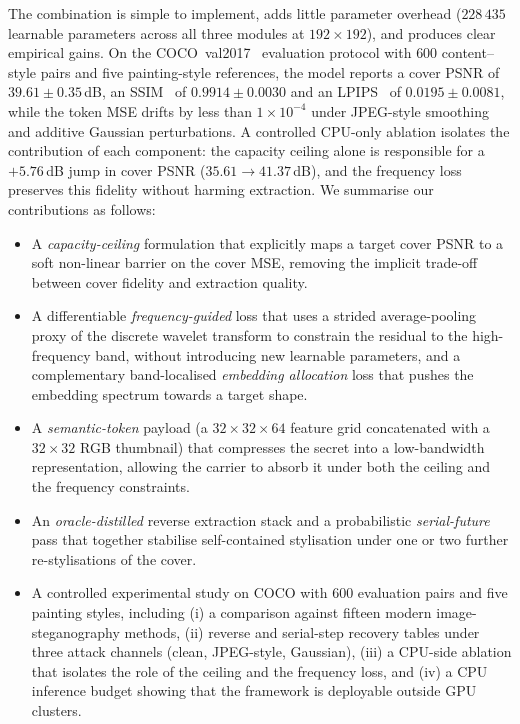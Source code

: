 \documentclass[conference]{IEEEtran}
\begin{document}
The combination is simple to implement, adds little parameter overhead ($228\,435$ learnable parameters across all three modules at $192\!\times\!192$), and produces clear empirical gains. On the COCO~val2017~\cite{coco} evaluation protocol with $600$ content--style pairs and five painting-style references, the model reports a cover PSNR of $39.61\pm0.35$\,dB, an SSIM~\cite{ssim} of $0.9914\pm0.0030$ and an LPIPS~\cite{lpips} of $0.0195\pm0.0081$, while the token MSE drifts by less than $1\times10^{-4}$ under JPEG-style smoothing and additive Gaussian perturbations. A controlled CPU-only ablation isolates the contribution of each component: the capacity ceiling alone is responsible for a $+5.76$\,dB jump in cover PSNR ($35.61\to41.37$\,dB), and the frequency loss preserves this fidelity without harming extraction. We summarise our contributions as follows:
\begin{itemize}
    \item A \emph{capacity-ceiling} formulation that explicitly maps a target cover PSNR to a soft non-linear barrier on the cover MSE, removing the implicit trade-off between cover fidelity and extraction quality.
    \item A differentiable \emph{frequency-guided} loss that uses a strided average-pooling proxy of the discrete wavelet transform to constrain the residual to the high-frequency band, without introducing new learnable parameters, and a complementary band-localised \emph{embedding allocation} loss that pushes the embedding spectrum towards a target shape.
    \item A \emph{semantic-token} payload (a $32\!\times\!32\!\times\!64$ feature grid concatenated with a $32\!\times\!32$ RGB thumbnail) that compresses the secret into a low-bandwidth representation, allowing the carrier to absorb it under both the ceiling and the frequency constraints.
    \item An \emph{oracle-distilled} reverse extraction stack and a probabilistic \emph{serial-future} pass that together stabilise self-contained stylisation under one or two further re-stylisations of the cover.
    \item A controlled experimental study on COCO with $600$ evaluation pairs and five painting styles, including (i) a comparison against fifteen modern image-steganography methods, (ii) reverse and serial-step recovery tables under three attack channels (clean, JPEG-style, Gaussian), (iii) a CPU-side ablation that isolates the role of the ceiling and the frequency loss, and (iv) a CPU inference budget showing that the framework is deployable outside GPU clusters.
\end{itemize}
\end{document}
